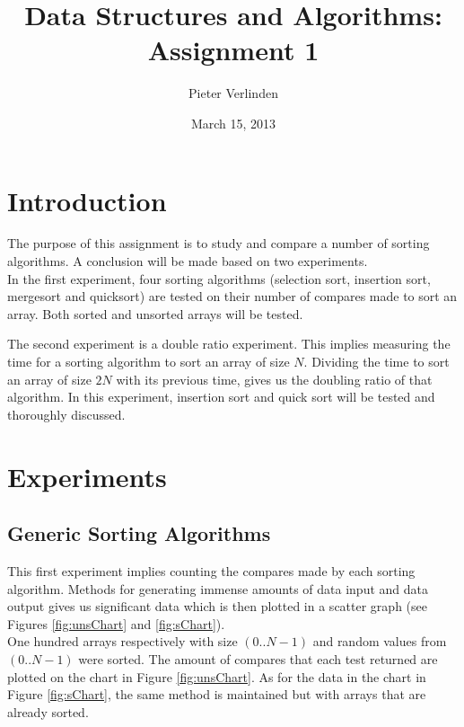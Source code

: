 \documentclass[pdftex,11pt,a4paper,english,titlepage]{article}
\author{Pieter Verlinden}
\title{Data Structures and Algorithms: Assignment 1}
\date{March 15, 2013}
\begin{document}

\tableofcontents
\newpage
\section{Introduction}

\indent The purpose of this assignment is to study and compare a number of sorting algorithms. A conclusion will be made based on two experiments.\\

In the first experiment, four sorting algorithms (selection sort, insertion sort, mergesort and quicksort) are tested on their number of compares made to sort an array. Both sorted and unsorted arrays will be tested.

The second experiment is a double ratio experiment. This implies measuring the time for a sorting algorithm to sort an array of size $N$. Dividing the time to sort an array of size $2N$ with its previous time, gives us the doubling ratio of that algorithm.
In this experiment, insertion sort and quick sort will be tested and thoroughly discussed.
\section{Experiments}
		
	\subsection{Generic Sorting Algorithms}\label{sec:GSA}
This first experiment implies counting the compares made by each sorting algorithm. Methods for generating immense amounts of data input and data output gives us significant data which is then plotted in a scatter graph (see Figures \ref{fig:unsChart} and \ref{fig:sChart}).\\

One hundred arrays respectively with size $(0..N-1)$ and random values from $(0..N-1)$ were sorted. The amount of compares that each test returned are plotted on the chart in Figure \ref{fig:unsChart}.
As for the data in the chart in Figure \ref{fig:sChart}, the same method is maintained but with arrays that are already sorted.\\
\end{document}
